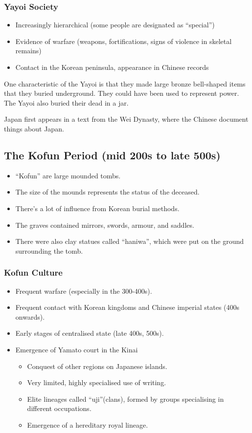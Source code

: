 \documentclass[class=article, crop=false]{standalone}
\begin{document}
  \subsubsection{Yayoi Society}
  \begin{itemize}
    \item Increasingly hierarchical (some people are designated as ``special'')
    \item Evidence of warfare (weapons, fortifications, signs of violence in skeletal remains)
    \item Contact in the Korean peninsula, appearance in Chinese records
  \end{itemize}
  One characteristic of the Yayoi is that they made large bronze bell-shaped items that they buried underground. They could have been used to represent power. The Yayoi also buried their dead in a jar.
  \begin{note}{}
    Japan first appears in a text from the Wei Dynasty, where the Chinese document things about Japan.
  \end{note}
  \subsection{The Kofun Period (mid 200s to late 500s)}
  \begin{itemize}
    \item ``Kofun'' are large mounded tombs.
    \item The size of the mounds represents the status of the deceased.
    \item There's a lot of influence from Korean burial methods.
    \item The graves contained mirrors, swords, armour, and saddles.
    \item There were also clay statues called ``haniwa'', which were put on the ground surrounding the tomb.
  \end{itemize}
  \subsubsection{Kofun Culture}
  \begin{itemize}
    \item Frequent warfare (especially in the 300-400s).
    \item Frequent contact with Korean kingdoms and Chinese imperial states (400s onwards).
    \item Early stages of centralised state (late 400s, 500s).
    \item Emergence of Yamato court in the Kinai
    \begin{itemize}
      \item Conquest of other regions on Japanese islands.
      \item Very limited, highly specialised use of writing.
      \item Elite lineages called ``uji''(clans), formed by groups specialising in different occupations.
      \item Emergence of a hereditary royal lineage.
    \end{itemize}
  \end{itemize}
\end{document}

